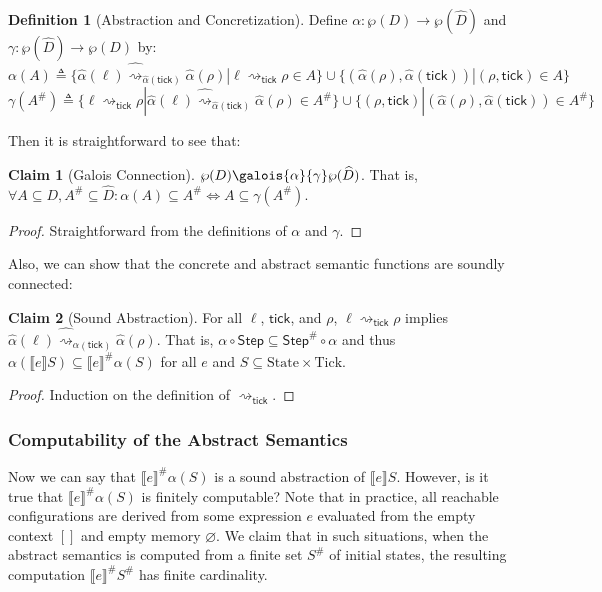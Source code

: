 \documentclass{article}
\theoremstyle{definition}
\newtheorem{definition}{Definition}[section]
\newtheorem{clm}{Claim}[section]
\newcommand*{\A}[1]{\widehat{#1}}
\newcommand*{\Abs}[1]{{#1}^{\#}}
\newcommand*{\State}{\text{State}}
\newcommand*{\Tick}{\text{Tick}}
\newcommand*{\Step}{\mathsf{Step}}
\newcommand*{\semarrow}{\rightsquigarrow}
\newcommand*{\asemarrow}{\widehat{\rightsquigarrow}}
\newcommand*{\sembracket}[1]{\lBrack{#1}\rBrack}
\newcommand*{\tick}{\mathsf{tick}}
\begin{document}
\begin{definition}[Abstraction and Concretization]
  Define $\alpha:\wp(D)\rightarrow\wp(\A{D})$ and $\gamma:\wp(\A{D})\rightarrow\wp(D)$ by:
  \[
    \alpha(A)\triangleq\{\A\alpha(\ell)\asemarrow_{\A\alpha(\tick)}\A\alpha(\rho)|\ell\semarrow_\tick\rho\in A\}\cup\{(\A\alpha(\rho),\A\alpha(\tick))|(\rho,\tick)\in A\}
  \]
  \[
    \gamma(\Abs{A})\triangleq\{\ell\semarrow_\tick\rho|\A\alpha(\ell)\asemarrow_{\A\alpha(\tick)}\A\alpha(\rho)\in\Abs{A}\}\cup\{(\rho,\tick)|(\A\alpha(\rho),\A\alpha(\tick))\in\Abs{A}\}
  \]
\end{definition}

Then it is straightforward to see that:
\begin{clm}[Galois Connection]
  $\wp(D)\galois{\alpha}{\gamma}\wp(\A{D})$. That is, $\forall A\subseteq D,\Abs{A}\subseteq\A{D}:\alpha(A)\subseteq\Abs{A}\Leftrightarrow A\subseteq\gamma(\Abs{A})$.
\end{clm}
\begin{proof}
  Straightforward from the definitions of $\alpha$ and $\gamma$.
\end{proof}

Also, we can show that the concrete and abstract semantic functions are soundly connected:
\begin{clm}[Sound Abstraction]
  For all $\ell$, $\tick$, and $\rho$, $\ell\semarrow_{\tick}\rho$ implies $\A\alpha(\ell)\asemarrow_{\A\alpha(\tick)}\A\alpha(\rho)$.
  That is, $\alpha\circ\Step\subseteq\Abs\Step\circ\alpha$ and thus $\alpha(\sembracket{e}S)\subseteq\Abs{\sembracket{e}}\alpha(S)$ for all $e$ and $S\subseteq\State\times\Tick$.
\end{clm}
\begin{proof}
  Induction on the definition of $\semarrow_{\tick}$.
\end{proof}

\subsubsection{Computability of the Abstract Semantics}
Now we can say that $\Abs{\sembracket{e}}\alpha(S)$ is a sound abstraction of $\sembracket{e}S$.
However, is it true that $\Abs{\sembracket{e}}\alpha(S)$ is finitely computable?
Note that in practice, all reachable configurations are derived from some expression $e$ evaluated from the empty context $[]$ and empty memory $\varnothing$.
We claim that in such situations, when the abstract semantics is computed from a finite set $\Abs{S}$ of initial states, the resulting computation $\Abs{\sembracket{e}}\Abs{S}$ has finite cardinality.
\end{document}

